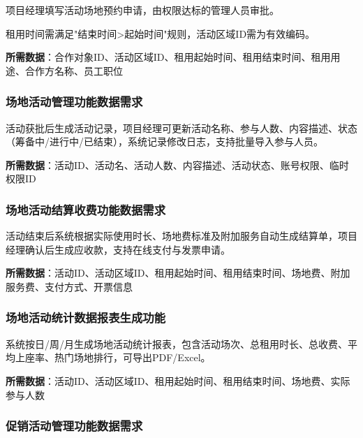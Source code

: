 \documentclass[]{article}
\begin{document}
项目经理填写活动场地预约申请，由权限达标的管理人员审批。

租用时间需满足"结束时间\textgreater{}起始时间"规则，活动区域ID需为有效编码。

\textbf{所需数据}：合作对象ID、活动区域ID、租用起始时间、租用结束时间、租用用途、合作方名称、员工职位

\hypertarget{ux573aux5730ux6d3bux52a8ux7ba1ux7406ux529fux80fdux6570ux636eux9700ux6c42}{%
  \subsubsection{场地活动管理功能数据需求}\label{ux573aux5730ux6d3bux52a8ux7ba1ux7406ux529fux80fdux6570ux636eux9700ux6c42}}

活动获批后生成活动记录，项目经理可更新活动名称、参与人数、内容描述、状态（筹备中/进行中/已结束），系统记录修改日志，支持批量导入参与人员。

\textbf{所需数据}：活动ID、活动名、活动人数、内容描述、活动状态、账号权限、临时权限ID

\hypertarget{ux573aux5730ux6d3bux52a8ux7ed3ux7b97ux6536ux8d39ux529fux80fdux6570ux636eux9700ux6c42}{%
  \subsubsection{场地活动结算收费功能数据需求}\label{ux573aux5730ux6d3bux52a8ux7ed3ux7b97ux6536ux8d39ux529fux80fdux6570ux636eux9700ux6c42}}

活动结束后系统根据实际使用时长、场地费标准及附加服务自动生成结算单，项目经理确认后生成应收款，支持在线支付与发票申请。

\textbf{所需数据}：活动ID、活动区域ID、租用起始时间、租用结束时间、场地费、附加服务费、支付方式、开票信息

\hypertarget{ux573aux5730ux6d3bux52a8ux7edfux8ba1ux6570ux636eux62a5ux8868ux751fux6210ux529fux80fd}{%
  \subsubsection{场地活动统计数据报表生成功能}\label{ux573aux5730ux6d3bux52a8ux7edfux8ba1ux6570ux636eux62a5ux8868ux751fux6210ux529fux80fdux6570ux636eux9700ux6c42}}

系统按日/周/月生成场地活动统计报表，包含活动场次、总租用时长、总收费、平均上座率、热门场地排行，可导出PDF/Excel。

\textbf{所需数据}：活动ID、活动区域ID、租用起始时间、租用结束时间、场地费、实际参与人数

\hypertarget{ux4fc3ux9500ux6d3bux52a8ux7ba1ux7406ux529fux80fdux6570ux636eux9700ux6c42}{%
  \subsubsection{促销活动管理功能数据需求}\label{ux4fc3ux9500ux6d3bux52a8ux7ba1ux7406ux529fux80fdux6570ux636eux9700ux6c42}}
\end{document}
